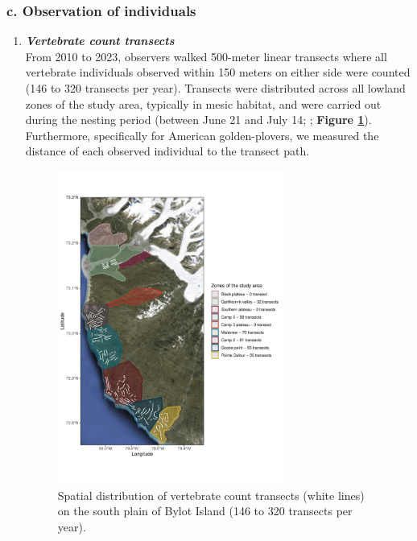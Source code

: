 \documentclass[a4paper,twoside,10pt]{article}
\begin{document}
\subsubsection*{c. Observation of individuals}
\begin{enumerate}[label=\roman*]
\item[] \textit{\textbf{Vertebrate count transects}}\\
From 2010 to 2023, observers walked 500-meter linear transects where all vertebrate individuals observed within 150 meters on either side were counted (146 to 320 transects per year). Transects were distributed across all lowland zones of the study area, typically in mesic habitat, and were carried out during the nesting period (between June 21 and July 14; \citet{duchesne2021}; \textbf{Figure \ref{figure:transects}}). Furthermore, specifically for American golden-plovers, we measured the distance of each observed individual to the transect path.
\\
\begin{figure}
\centering
  \includegraphics[width=0.7\textwidth, angle=0]{figures/transects.pdf}
  \vspace{-35pt} %
  \caption{Spatial distribution of vertebrate count transects (white lines) on the south plain of Bylot Island (146 to 320 transects per year).}
 \label{figure:transects}
\end{figure}
\newpage


\end{enumerate}
\end{document}
